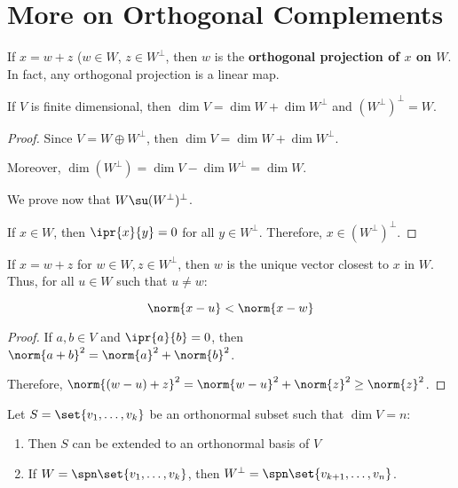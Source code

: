 \documentclass[11pt]{scrartcl}
\begin{document}
\section{More on Orthogonal Complements}

\begin{remark}
  If $x = w+ z$ ($w\in W$, $z\in W^{\bot}$, then $w$ is the
  \textbf{orthogonal projection of $x$ on $W$}.  In fact, any
  orthogonal projection is a linear map.
\end{remark}

\begin{corollary}
  If $V$ is finite dimensional, then $\dim V = \dim W + \dim W^{\bot}$
  and $(W^{\bot})^{\bot} = W$.
\end{corollary}
\begin{proof}
  Since $V = W \oplus W^{\bot}$, then
  $\dim V = \dim W + \dim W^{\bot}$.

  Moreover, $\dim(W^{\bot}) = \dim V - \dim W^{\bot} = \dim W$.

  We prove now that $W\su (W^{\bot})^{\bot}$.

  If $x\in W$, then $\ipr{x}{y} = 0$ for all $y\in W^\bot$. Therefore,
  $x\in (W^{\bot})^{\bot}$.
\end{proof}

\begin{corollary}
  If $x = w+z$ for $w\in W, z \in W^{\bot}$, then $w$ is the unique vector closest to $x$ in $W$. Thus, for all $u\in W$ such that $u\neq w$:
  
  \begin{equation*}
    \norm{x-u} < \norm{x-w}
  \end{equation*}
\end{corollary}
\begin{proof}
  If $a, b \in V$ and $\ipr{a}{b} = 0$, then
  $\norm{a+b}^2 = \norm{a}^{2}+\norm{b}^{2}$.

  Therefore,
  $\norm{(w-u)+z}^2= \norm{w-u}^2 + \norm{z}^2 \geq \norm{z}^2$.
\end{proof}

\begin{theorem}
  Let $S = \set{v_1,\dots, v_k}$ be an orthonormal subset such that $\dim V = n$:
  \begin{enumerate}[label=\alph*)]
  \item Then $S$ can be extended to an orthonormal basis of $V$
  \item If $W = \spn\set{v_1, \dots, v_k}$, then $W^{\bot} = \spn\set{v_{k+1}, \dots, v_n}$.
  \end{enumerate}
\end{theorem}
\end{document}
